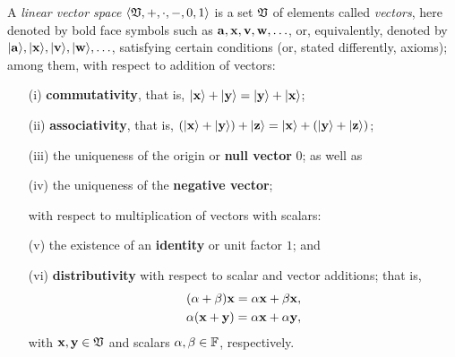 A {\em linear vector space}      $\langle  \frak V , +, \cdot , -,  0, 1\rangle$
is a set $\frak V$ of elements called {\em vectors},
here denoted by  bold face  symbols such as
$
{\bf a},
{\bf x},
{\bf v},
{\bf w},
\ldots
$,
or, equivalently, denoted by
$
\vert {\bf a}\rangle,
\vert {\bf x}\rangle,
\vert {\bf v}\rangle,
\vert {\bf w}\rangle,
\ldots
$,
satisfying certain conditions (or, stated differently, axioms); among them,
with respect to addition of vectors:
\begin{itemize}
\item[(i)]
{\bf commutativity}, that is, $\vert {\bf x}\rangle + \vert {\bf y}\rangle   = \vert {\bf y}\rangle + \vert {\bf x}\rangle$;
\item[(ii)]
{\bf associativity}, that is, $(\vert {\bf x}\rangle + \vert {\bf y}\rangle ) +  \vert {\bf z}\rangle = \vert {\bf x}\rangle + (\vert {\bf y}\rangle +  \vert {\bf z}\rangle )$;
\item[(iii)]
the uniqueness of the origin or {\bf null vector} $0$;
as well as
\item[(iv)]
the uniqueness of  the {\bf negative vector};
\item[ ]
with respect to multiplication of vectors with scalars:
\item[(v)]
the existence of an {\bf identity} or unit factor $1$; and
\item[(vi)]
{\bf distributivity} with respect to scalar and vector additions; that is,
\begin{equation}
\begin{split}
(\alpha +\beta ){\bf x} = \alpha {\bf x}+\beta  {\bf x}, \\
\alpha ({\bf x} +{\bf y}) = \alpha {\bf x}+\alpha {\bf y},
\end{split}
\end{equation}
with ${\bf x}, {\bf y} \in \frak V$ and scalars $\alpha ,\beta \in  {\Bbb F}$,
respectively.
\end{itemize}

